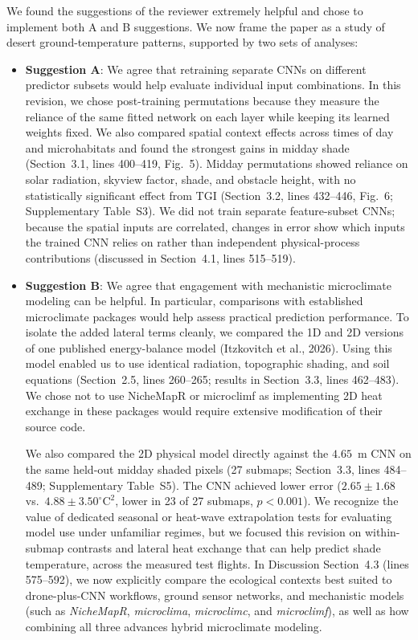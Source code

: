 \documentclass[12pt,english]{reviewresponse}
\begin{document}
\begin{revresponse}
We found the suggestions of the reviewer extremely helpful and chose to implement both A and B suggestions. We now frame the paper as a study of desert ground-temperature patterns, supported by two sets of analyses:
\begin{itemize}[leftmargin=*, itemsep=0.2em]
    \item \textbf{Suggestion A}: We agree that retraining separate CNNs on different predictor subsets would help evaluate individual input combinations. In this revision, we chose post-training permutations because they measure the reliance of the same fitted network on each layer while keeping its learned weights fixed. We also compared spatial context effects across times of day and microhabitats and found the strongest gains in midday shade (Section~3.1, lines 400--419, Fig.~5). Midday permutations showed reliance on solar radiation, skyview factor, shade, and obstacle height, with no statistically significant effect from TGI (Section~3.2, lines 432--446, Fig.~6; Supplementary Table~S3). We did not train separate feature-subset CNNs; because the spatial inputs are correlated, changes in error show which inputs the trained CNN relies on rather than independent physical-process contributions (discussed in Section~4.1, lines 515--519).
    \item \textbf{Suggestion B}: We agree that engagement with mechanistic microclimate modeling can be helpful. In particular, comparisons with established microclimate packages would help assess practical prediction performance. To isolate the added lateral terms cleanly, we compared the 1D and 2D versions of one published energy-balance model (Itzkovitch et al., 2026). Using this model enabled us to use identical radiation, topographic shading, and soil equations (Section~2.5, lines 260--265; results in Section~3.3, lines 462--483). We chose not to use NicheMapR or microclimf as implementing 2D heat exchange in these packages would require extensive modification of their source code. 
    
    We also compared the 2D physical model directly against the $4.65$~m CNN on the same held-out midday shaded pixels (27 submaps; Section~3.3, lines 484--489; Supplementary Table~S5). The CNN achieved lower error ($2.65 \pm 1.68$ vs.\ $4.88 \pm 3.50^{\circ}\mathrm{C}^2$, lower in 23 of 27 submaps, $p < 0.001$). We recognize the value of dedicated seasonal or heat-wave extrapolation tests for evaluating model use under unfamiliar regimes, but we focused this revision on within-submap contrasts and lateral heat exchange that can help predict shade temperature, across the measured test flights. In Discussion Section~4.3 (lines 575--592), we now explicitly compare the ecological contexts best suited to drone-plus-CNN workflows, ground sensor networks, and mechanistic models (such as \textit{NicheMapR}, \textit{microclima}, \textit{microclimc}, and \textit{microclimf}), as well as how combining all three advances hybrid microclimate modeling.
\end{itemize}
\end{revresponse}
\end{document}
